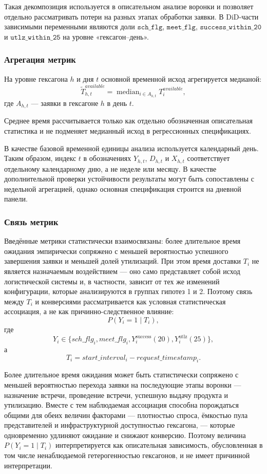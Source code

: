 \documentclass[14pt,a4paper]{extarticle}
\begin{document}
Такая декомпозиция используется в описательном анализе воронки и позволяет отдельно рассматривать потери на разных этапах обработки заявки. В DiD-части зависимыми переменными являются доли \(\texttt{sch\_flg}\), \(\texttt{meet\_flg}\), \(\texttt{success\_within\_20}\) и \(\texttt{utlz\_within\_25}\) на уровне «гексагон--день».

\subsubsection{Агрегация метрик}

На уровне гексагона \(h\) и дня \(t\) основной временной исход агрегируется медианой:
\[
    \widetilde{T}^{available}_{h,t}
    =\operatorname{median}_{i\in A_{h,t}} T^{available}_i,
\]
где \(A_{h,t}\) --- заявки в гексагоне \(h\) в день \(t\).

Среднее время рассчитывается только как отдельно обозначенная описательная статистика и не подменяет медианный исход в регрессионных спецификациях.

В качестве базовой временной единицы анализа используется календарный день. Таким образом, индекс \(t\) в обозначениях \(Y_{h,t}\), \(D_{h,t}\) и \(X_{h,t}\) соответствует отдельному календарному дню, а не неделе или месяцу. В качестве дополнительной проверки устойчивости результаты могут быть сопоставлены с недельной агрегацией, однако основная спецификация строится на дневной панели.

\subsubsection{Связь метрик}

Введённые метрики статистически взаимосвязаны: более длительное время ожидания эмпирически сопряжено с меньшей вероятностью успешного завершения заявки и меньшей долей утилизаций. При этом время доставки $T_i$ не является назначаемым воздействием --- оно само представляет собой исход логистической системы и, в частности, зависит от тех же изменений конфигурации, которые анализируются в группах гипотез 1 и 2. Поэтому связь между $T_i$ и конверсиями рассматривается как условная статистическая ассоциация, а не как причинно-следственное влияние:
\[
P(Y_i = 1\mid T_i),
\]
где
\[
Y_i \in \{sch\_flg_i, meet\_flg_i, Y_i^{\mathrm{success}}(20), Y_i^{\mathrm{utlz}}(25)\},
\]
а
\[
T_i = start\_interval_i - request\_timestamp_i.
\]

Более длительное время ожидания может быть статистически сопряжено с меньшей вероятностью перехода заявки на последующие этапы воронки --- назначение встречи, проведение встречи, успешную выдачу продукта и утилизацию. Вместе с тем наблюдаемая ассоциация способна порождаться общими для обеих величин факторами --- плотностью спроса, ёмкостью пула представителей и инфраструктурной доступностью гексагона, --- которые одновременно удлиняют ожидание и снижают конверсию. Поэтому величина $P(Y_i=1 \mid T_i)$ интерпретируется как описательная зависимость, обусловленная в том числе ненаблюдаемой гетерогенностью гексагонов, и не имеет причинной интерпретации.
\end{document}
